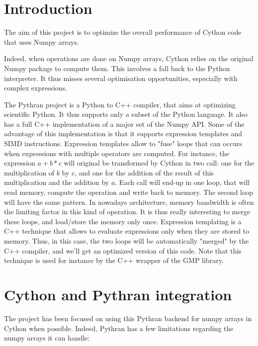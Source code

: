 \documentclass{deliverablereport}
\author{}
\begin{document}
\maketitle
%
\strut\githubissuedescription
\newpage\tableofcontents\newpage

\section{Introduction}

The aim of this project is to optimize the overall performance of Cython code
that uses Numpy arrays.

Indeed, when operations are done on Numpy arrays, Cython relies on the original
Numpy package to compute them. This involves a fall back to the Python
interpreter. It thus misses several optimisation opportunities, especially with
complex expressions.

The Pythran project is a Python to C++ compiler, that aims at optimizing
scientific Python. It thus supports only a subset of the Python language.
It also has a full C++ implementation of a major set of the Numpy API. Some of
the advantage of this implementation is that it supports expression templates
and SIMD instructions. Expression templates allow to "fuse" loops that can
occurs when expressions with multiple operators are computed. For instance,
the expression $a+b*c$ will original be transformed by Cython in two call: one
for the multiplication of $b$ by $c$, and one for the addition of the result of
this multiplication and the addition by $a$. Each call will end-up in one loop,
that will read memory, compute the operation and write back to memory. The
second loop will have the same pattern. In nowadays architecture, memory
bandwidth is often the limiting factor in this kind of operation. It is thus
really interesting to merge these loops, and load/store the memory only once.
Expression templating is a C++ technique that allows to evaluate expressions
only when they are stored to memory. Thus, in this case, the two loops will be
automatically "merged" by the C++ compiler, and we'll get an optimized version
of this code. Note that this technique is used for instance by the C++ wrapper
of the GMP library.

\section{Cython and Pythran integration}

The project has been focused on using this Pythran backend for numpy arrays in
Cython when possible. Indeed, Pythran has a few limitations regarding the numpy
arrays it can handle:
\end{document}

